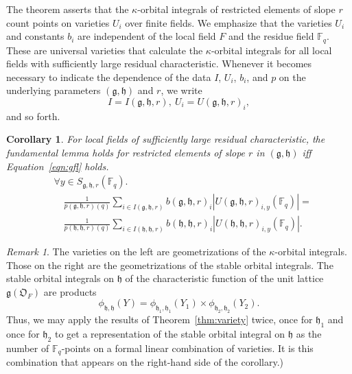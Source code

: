 \documentclass[11pt]{amsart}
\newtheorem{corollary}[theorem]{Corollary}
\theoremstyle{definition}
\theoremstyle{remark}
\newtheorem{remark}[theorem]{Remark}
\numberwithin{equation}{theorem}
\def\F{{F}}
\def\A{{\mathfrak{O}_\F}}
\def\f{{\mathbb{F}_q}}
\def\lie#1{{\mathfrak{#1}}}
\def\orb#1#2{{\phi_{\lie{#1},\lie{#2}}}}
\begin{document}
The theorem asserts that the $\kappa$-orbital integrals of
restricted elements of slope $r$ count points on varieties $U_i$
over finite fields.   We emphasize that the varieties $U_i$ and
constants $b_i$ are independent of the local field $F$ and the
residue field $\f$. These are universal varieties that calculate
the $\kappa$-orbital integrals for all local fields with
sufficiently large residual characteristic. Whenever it becomes
necessary to indicate the dependence of the data $I$, $U_i$,
$b_i$, and $p$ on the underlying parameters $(\lie{g},\lie{h})$
and $r$, we write
   \begin{equation}I=I(\lie{g},\lie{h},r),\
U_i=U(\lie{g},\lie{h},r)_i,\end{equation}
and so forth.


\begin{corollary}  For local fields of sufficiently large residual
characteristic, the fundamental lemma holds for restricted
elements of slope $r$ in $(\lie{g},\lie{h})$ iff
Equation~\ref{eqn:gfl} holds.
  \begin{equation}
  \begin{array}{lll}
  &\forall y\in S_{\lie{g},\lie{h},r}(\f).\quad\\
  &\quad\frac{1}{p(\lie{g},\lie{h},r)(q)}\sum_{i\in
  I(\lie{g},\lie{h},r)}
   b(\lie{g},\lie{h},r)_i
   |U(\lie{g},\lie{h},r)_{i,y}(\f)| =\\
  &\quad\frac{1}{p(\lie{h},\lie{h},r)(q)} \sum_{i\in I(\lie{h},\lie{h},r)}
   b(\lie{h},\lie{h},r)_i
   |U(\lie{h},\lie{h},r)_{i,y}(\f)|.
   \end{array}
   \label{eqn:gfl}
  \end{equation}
\end{corollary}

\begin{remark}   The varieties on the left are geometrizations of
the  $\kappa$-orbital integrals.  Those on the right are the
geometrizations of the stable orbital integrals. The stable
orbital integrals on $\lie{h}$ of the characteristic function of
the unit lattice $\lie{g}(\A)$ are products
  \begin{equation}
  \orb{h}{h}(Y) = \orb{h_1}{h_1}(Y_1)\times
  \orb{h_2}{h_2}(Y_2).
  \end{equation}
Thus, we may apply the results of Theorem~\ref{thm:variety} twice,
once for $\lie{h}_1$ and once for $\lie{h}_2$ to get a
representation of the stable orbital integral on $\lie{h}$ as the
number of $\f$-points on a formal linear combination of varieties.
It is this combination that appears on the right-hand side of the
corollary.)
\end{remark}
\end{document}
